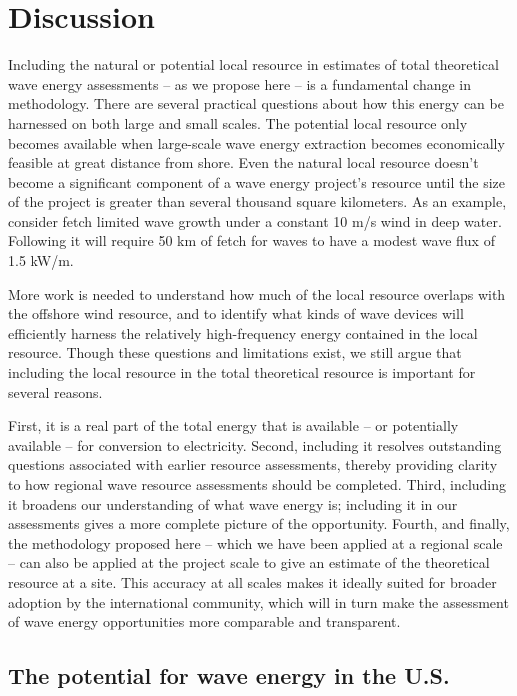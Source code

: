 \section{Discussion} \label{sec:discussion}

Including the natural or potential local resource in estimates of total theoretical wave energy assessments -- as we propose here -- is a fundamental change in methodology. There are several practical questions about how this energy can be harnessed on both large and small scales. 
The potential local resource only becomes available when large-scale wave energy extraction becomes economically feasible at great distance from shore. Even the natural local resource doesn't become a significant component of a wave energy project's resource until the size of the project is greater than several thousand square kilometers. As an example, consider fetch limited wave growth under a constant 10 m/s wind in deep water. Following \citet{donelan1980similarity} it will require 50 km of fetch for waves to have a modest wave flux of 1.5 kW/m. 

More work is needed to understand how much of the local resource overlaps with the offshore wind resource, and to identify what kinds of wave devices will efficiently harness the relatively high-frequency energy contained in the local resource. Though these questions and limitations exist, we still argue that including the local resource in the total theoretical resource is important for several reasons.

First, it is a real part of the total energy that is available -- or potentially available -- for conversion to electricity. Second, including it resolves outstanding questions associated with earlier resource assessments, thereby providing clarity to how regional wave resource assessments should be completed.  Third, including it broadens our understanding of what wave energy is; including it in our assessments gives a more complete picture of the opportunity. Fourth, and finally, the methodology proposed here -- which we have been applied at a regional scale -- can also be applied at the project scale to give an estimate of the theoretical resource at a site. This accuracy at all scales makes it ideally suited for broader adoption by the international community, which will in turn make the assessment of wave energy opportunities more comparable and transparent.

\subsection{The potential for wave energy in the U.S.}

